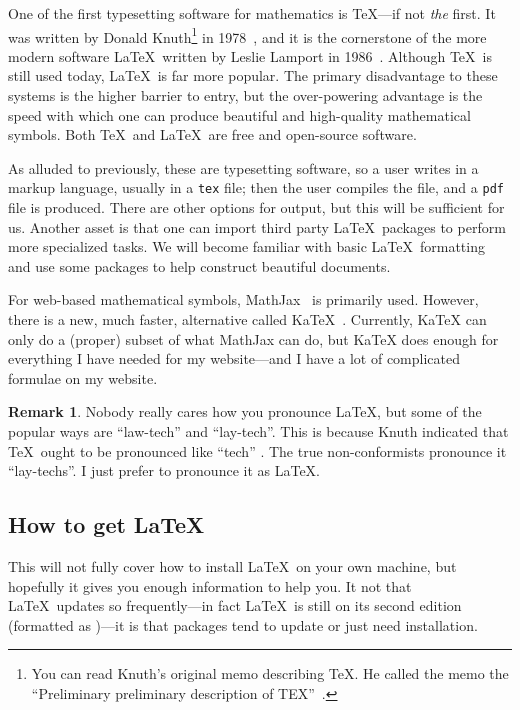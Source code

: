 \documentclass[a4paper, 12pt]{article}
\numberwithin{equation}{section}
\numberwithin{figure}{section}
\theoremstyle{definition}
\newtheorem{remark}[thm]{Remark}
\begin{document}
One of the first typesetting software for mathematics is \TeX---if not
\textit{the} first. It was written by Donald Knuth\footnote{You can read Knuth's
original memo describing \TeX. He called the memo the ``Preliminary preliminary
description of TEX''~\cite{TeX-draft}.} in 1978~\cite{Knuth-Quanta}, and it is
the cornerstone of the more modern software \LaTeX\ written by Leslie Lamport in
1986~\cite{Lamport}. Although \TeX\ is still used today, \LaTeX\ is far more
popular. The primary disadvantage to these systems is the higher barrier to
entry, but the over-powering advantage is the speed with which one can produce
beautiful and high-quality mathematical symbols. Both \TeX\ and \LaTeX\ are free
and open-source software. 

As alluded to previously, these are typesetting software, so a user writes in a
markup language, usually in a \texttt{tex} file; then the user compiles the
file, and a \texttt{pdf} file is produced. There are other options for output,
but this will be sufficient for us. Another asset is that one can import third
party \LaTeX\ packages to perform more specialized tasks. We will become
familiar with basic \LaTeX\ formatting and use some packages to help construct
beautiful documents. 

For web-based mathematical symbols, MathJax~\cite{MathJax} is primarily used.
However, there is a new, much faster, alternative called KaTeX~\cite{KaTeX}.
Currently, KaTeX can only do a (proper) subset of what MathJax can do, but KaTeX
does enough for everything I have needed for my website---and I have a lot of
complicated formulae on my website. 

\begin{remark}
	Nobody really cares how you pronounce \LaTeX, but some of the popular ways
	are ``law-tech'' and ``lay-tech''. This is because Knuth indicated that
	\TeX\ ought to be pronounced like ``tech'' \cite[Paragraph 2]{TeX-draft}.
	The true non-conformists pronounce it ``lay-techs''. I just prefer to
	pronounce it as \LaTeX.
\end{remark}

\subsection{How to get \LaTeX}

This will not fully cover how to install \LaTeX\ on your own machine, but
hopefully it gives you enough information to help you. It not that \LaTeX\
updates so frequently---in fact \LaTeX\ is still on its second edition
(formatted as \LaTeXe)---it is that packages tend to update or just need
installation. 
\end{document}
